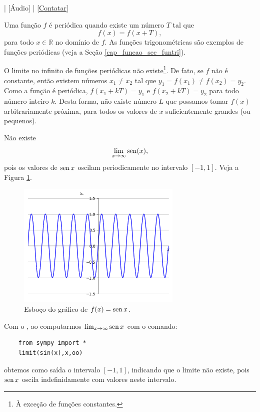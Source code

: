 \begin{flushright}
  [Vídeo] | [Áudio] | \href{https://phkonzen.github.io/notas/contato.html}{[Contatar]}
\end{flushright}

Uma função $f$ é periódica quando existe um número $T$ tal que
\begin{equation}
  f(x) = f(x+T),
\end{equation}
para todo $x\in\mathbb{R}$ no domínio de $f$. As funções trigonométricas são exemplos de funções periódicas (veja a Seção \ref{cap_funcao_sec_funtri}).

O limite no infinito de funções periódicas não existe\footnote{À exceção de funções constantes.}. De fato, se $f$ não é constante, então existem números $x_1\neq x_2$ tal que $y_1=f(x_1)\neq f(x_2)=y_2$. Como a função é periódica, $f(x_1+kT)=y_1$ e $f(x_2+kT) = y_2$ para todo número inteiro $k$. Desta forma, não existe número $L$ que possamos tomar $f(x)$ arbitrariamente próxima, para todos os valores de $x$ suficientemente grandes (ou pequenos).

\begin{ex}
  Não existe
  \begin{equation}
    \lim_{x\to \infty} \operatorname{sen}(x),
  \end{equation}
  pois os valores de $\operatorname{sen} x$ oscilam periodicamente no intervalo $[-1, 1]$. Veja a Figura \ref{fig:lim_senx_xinf}.

  \begin{figure}[H]
    \centering
    \includegraphics[width=0.7\textwidth]{./cap_lim/dados/fig_lim_senx_xinf/fig_lim_senx_xinf}
    \caption{Esboço do gráfico de $f(x)=\operatorname{sen} x$.}
    \label{fig:lim_senx_xinf}
  \end{figure}

  \ifispython
  Com o {\sympy}, ao computarmos $\lim_{x\to \infty} \operatorname{sen} x$ com o comando:
  \begin{lstlisting}
    from sympy import *
    limit(sin(x),x,oo)
  \end{lstlisting}
  obtemos como saída o intervalo $[-1, 1]$, indicando que o limite não existe, pois $\operatorname{sen} x$ oscila indefinidamente com valores neste intervalo.
  \fi
\end{ex}


